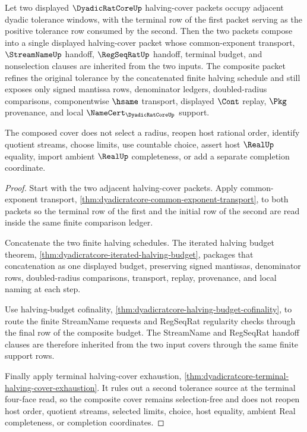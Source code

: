 \begin{theorem}
\label{thm:dyadicratcore-tolerance-halving-cover-composition}
Let two displayed $\DyadicRatCoreUp$ halving-cover packets occupy adjacent dyadic tolerance windows, with the terminal row of the first packet serving as the positive tolerance row consumed by the second. Then the two packets compose into a single displayed halving-cover packet whose common-exponent transport, $\StreamNameUp$ handoff, $\RegSeqRatUp$ handoff, terminal budget, and nonselection clauses are inherited from the two inputs. The composite packet refines the original tolerance by the concatenated finite halving schedule and still exposes only signed mantissa rows, denominator ledgers, doubled-radius comparisons, componentwise $\hsame$ transport, displayed $\Cont$ replay, $\Pkg$ provenance, and local $\NameCert_{\DyadicRatCoreUp}$ support.

The composed cover does not select a radius, reopen host rational order, identify quotient streams, choose limits, use countable choice, assert host $\RealUp$ equality, import ambient $\RealUp$ completeness, or add a separate completion coordinate.
\end{theorem}
\begin{proof}
Start with the two adjacent halving-cover packets. Apply common-exponent transport, \autoref{thm:dyadicratcore-common-exponent-transport}, to both packets so the terminal row of the first and the initial row of the second are read inside the same finite comparison ledger.

Concatenate the two finite halving schedules. The iterated halving budget theorem, \autoref{thm:dyadicratcore-iterated-halving-budget}, packages that concatenation as one displayed budget, preserving signed mantissas, denominator rows, doubled-radius comparisons, transport, replay, provenance, and local naming at each step.

Use halving-budget cofinality, \autoref{thm:dyadicratcore-halving-budget-cofinality}, to route the finite StreamName requests and RegSeqRat regularity checks through the final row of the composite budget. The StreamName and RegSeqRat handoff clauses are therefore inherited from the two input covers through the same finite support rows.

Finally apply terminal halving-cover exhaustion, \autoref{thm:dyadicratcore-terminal-halving-cover-exhaustion}. It rules out a second tolerance source at the terminal four-face read, so the composite cover remains selection-free and does not reopen host order, quotient streams, selected limits, choice, host equality, ambient Real completeness, or completion coordinates.
\end{proof}

